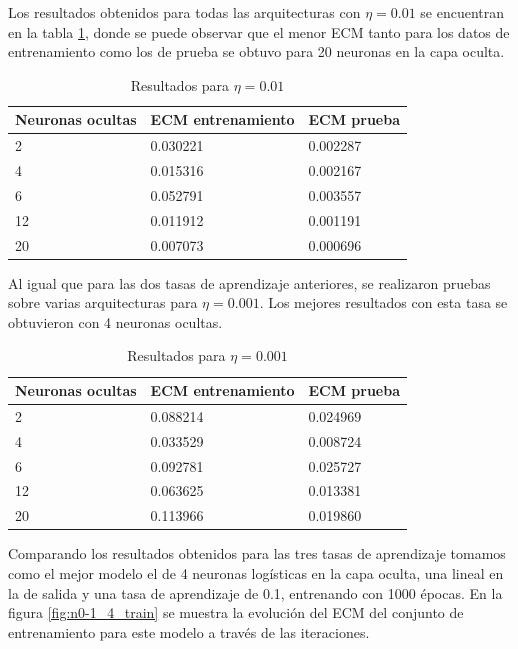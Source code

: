 \documentclass[a4paper]{article}
\begin{document}
Los resultados obtenidos para todas las arquitecturas con $\eta=0.01$ se encuentran en la tabla \ref{tabla:conejos_01}, donde se puede observar que el menor ECM tanto para los datos de entrenamiento como los de prueba se obtuvo para 20 neuronas en la capa oculta.
		
		\begin{table}[H]
		\begin{center}
		\begin{tabular}{|l|l|l|}
		\hline
		Neuronas ocultas & ECM entrenamiento & ECM prueba\\
		\hline \hline
		2 & 0.030221 & 0.002287 \\ \hline
		4 & 0.015316 & 0.002167\\ \hline
		6 & 0.052791 & 0.003557\\ \hline
		12 & 0.011912 & 0.001191 \\ \hline
		20 & 0.007073 & 0.000696 \\ \hline
		\end{tabular}
		\caption{Resultados para $\eta=0.01$}
		\label{tabla:conejos_01}
		\end{center}
		\end{table}
	
Al igual que para las dos tasas de aprendizaje anteriores, se realizaron pruebas sobre varias arquitecturas para $\eta=0.001$. Los mejores resultados con esta tasa se obtuvieron con 4 neuronas ocultas.
		
		\begin{table}[H]
		\begin{center}
		\begin{tabular}{|l|l|l|}
		\hline
		Neuronas ocultas & ECM entrenamiento & ECM prueba\\
		\hline \hline
		2 & 0.088214 & 0.024969 \\ \hline
		4 & 0.033529 & 0.008724\\ \hline
		6 & 0.092781 & 0.025727\\ \hline
		12 & 0.063625 & 0.013381 \\ \hline
		20 & 0.113966 & 0.019860 \\ \hline
		\end{tabular}
		\caption{Resultados para $\eta=0.001$}
		\label{tabla:conejos_001}
		\end{center}
		\end{table}		
		
Comparando los resultados obtenidos para las tres tasas de aprendizaje tomamos como el mejor modelo el de 4 neuronas logísticas en la capa oculta, una lineal en la de salida y una tasa de aprendizaje de 0.1, entrenando con 1000 épocas. En la figura \ref{fig:n0-1_4_train} se muestra la evolución del ECM del conjunto de entrenamiento para este modelo a través de las iteraciones. 
\end{document}

